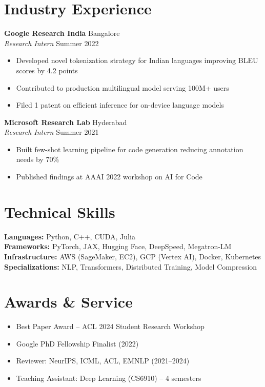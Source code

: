 \documentclass[11pt,letterpaper]{article}
\begin{document}
\section{Industry Experience}
\textbf{Google Research India} \hfill Bangalore\\
\textit{Research Intern} \hfill Summer 2022
\begin{itemize}
\item Developed novel tokenization strategy for Indian languages improving BLEU scores by 4.2 points
\item Contributed to production multilingual model serving 100M+ users
\item Filed 1 patent on efficient inference for on-device language models
\end{itemize}

\textbf{Microsoft Research Lab} \hfill Hyderabad\\
\textit{Research Intern} \hfill Summer 2021
\begin{itemize}
\item Built few-shot learning pipeline for code generation reducing annotation needs by 70\%
\item Published findings at AAAI 2022 workshop on AI for Code
\end{itemize}

\section{Technical Skills}
\textbf{Languages:} Python, C++, CUDA, Julia\\
\textbf{Frameworks:} PyTorch, JAX, Hugging Face, DeepSpeed, Megatron-LM\\
\textbf{Infrastructure:} AWS (SageMaker, EC2), GCP (Vertex AI), Docker, Kubernetes\\
\textbf{Specializations:} NLP, Transformers, Distributed Training, Model Compression

\section{Awards \& Service}
\begin{itemize}
\item Best Paper Award -- ACL 2024 Student Research Workshop
\item Google PhD Fellowship Finalist (2022)
\item Reviewer: NeurIPS, ICML, ACL, EMNLP (2021--2024)
\item Teaching Assistant: Deep Learning (CS6910) -- 4 semesters
\end{itemize}
\end{document}
